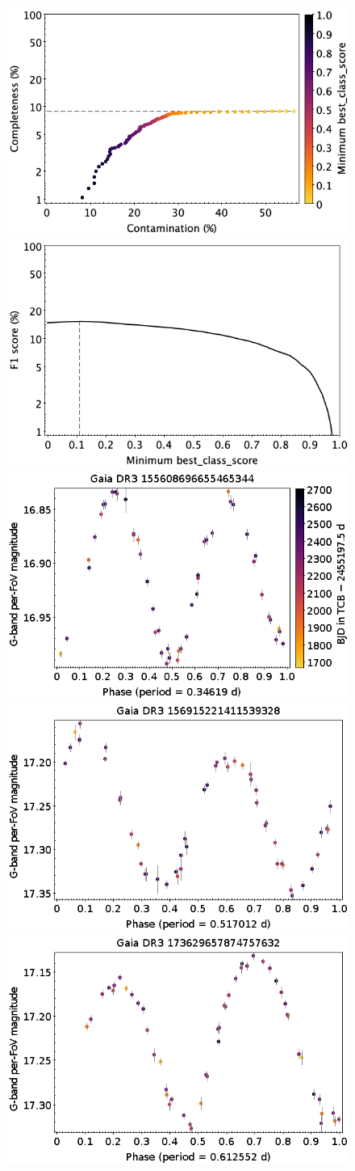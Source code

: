 \documentclass[longauth]{aa}
\begin{document}
\begin{appendix}
\begin{figure}
\centering
{} \includegraphics[width=0.45\hsize]{figures/appendix/ELL_cls_scc.png}  
\hspace{2mm}
 \includegraphics[width=0.45\hsize]{figures/appendix/ELL_cls_sf1.png} \\ 
\vspace{4mm}
 \includegraphics[width=0.45\hsize]{figures/appendix/Compact_Companion-16.png}  
\hspace{2mm}
 \includegraphics[width=0.45\hsize]{figures/appendix/Compact_Companion-20.png} \\
\vspace{4mm}
 \includegraphics[width=0.45\hsize]{figures/appendix/Compact_Companion-35.png}  

\end{figure}
\end{appendix}
\end{document}

